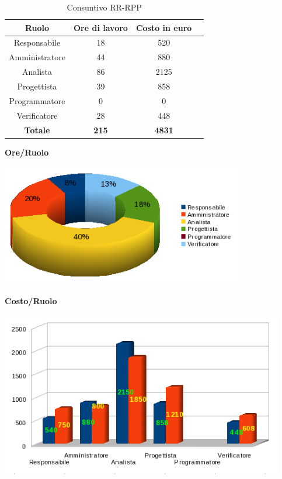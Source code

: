 \begin{table}[h]
	\begin{center}
		  \begin{tabular}{|c|c|c|c|}
		 \hline 
		 \textbf{Ruolo} & \textbf{Ore di lavoro} & \textbf{Costo in euro}\\
		 \hline
		Responsabile & 18 & 520 \\
		Amministratore & 44 & 880\\
		Analista & 86 & 2125\\
		Progettista & 39 & 858\\
		Programmatore & 0 & 0 \\
		Verificatore & 28 & 448\\
        \hline
        \textbf{Totale} & \textbf{215} & \textbf{4831}\\
		\hline
		\end{tabular}
	\caption{Consuntivo RR-RPP} 
	\label{tab:cons_RR-RPP}
	\end{center}	
\end{table}

\begin{center}\textbf{Ore/Ruolo}
\end{center}
\includegraphics[width=300pt]{Cons-RR-RPP2}

\begin{center}\textbf{Costo/Ruolo}
\end{center}
\includegraphics[width=350pt]{Cons-RR-RPP1}


